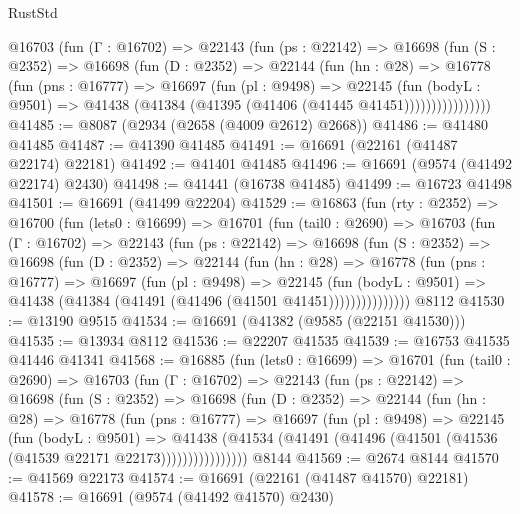 \begin{lexlean}{RustStd}
\begin{coremodule}
          @16703
            (fun (Γ : @16702) =>
            @22143
              (fun (ps : @22142) =>
              @16698
                (fun (S : @2352) =>
                @16698
                  (fun (D : @2352) =>
                  @22144
                    (fun (hn : @28) =>
                    @16778
                      (fun (pns : @16777) =>
                      @16697
                        (fun (pl : @9498) =>
                        @22145
                          (fun (bodyL : @9501) =>
                          @41438 (@41384 (@41395 (@41406 (@41445 @41451))))))))))))))))
@41485 := @8087 (@2934 (@2658 (@4009 @2612) @2668))
@41486 := @41480 @41485
@41487 := @41390 @41485
@41491 := @16691 (@22161 (@41487 @22174) @22181)
@41492 := @41401 @41485
@41496 := @16691 (@9574 (@41492 @22174) @2430)
@41498 := @41441 (@16738 @41485)
@41499 := @16723 @41498
@41501 := @16691 (@41499 @22204)
@41529 := @16863
    (fun (rty : @2352) =>
    @16700
      (fun (lets0 : @16699) =>
      @16701
        (fun (tail0 : @2690) =>
        @16703
          (fun (Γ : @16702) =>
          @22143
            (fun (ps : @22142) =>
            @16698
              (fun (S : @2352) =>
              @16698
                (fun (D : @2352) =>
                @22144
                  (fun (hn : @28) =>
                  @16778
                    (fun (pns : @16777) =>
                    @16697
                      (fun (pl : @9498) =>
                      @22145
                        (fun (bodyL : @9501) =>
                        @41438 (@41384 (@41491 (@41496 (@41501 @41451)))))))))))))))
    @8112
@41530 := @13190 @9515
@41534 := @16691 (@41382 (@9585 (@22151 @41530)))
@41535 := @13934 @8112
@41536 := @22207 @41535
@41539 := @16753 @41535 @41446 @41341
@41568 := @16885
    (fun (lets0 : @16699) =>
    @16701
      (fun (tail0 : @2690) =>
      @16703
        (fun (Γ : @16702) =>
        @22143
          (fun (ps : @22142) =>
          @16698
            (fun (S : @2352) =>
            @16698
              (fun (D : @2352) =>
              @22144
                (fun (hn : @28) =>
                @16778
                  (fun (pns : @16777) =>
                  @16697
                    (fun (pl : @9498) =>
                    @22145
                      (fun (bodyL : @9501) =>
                      @41438
                        (@41534
                          (@41491 (@41496 (@41501 (@41536 (@41539 @22171 @22173))))))))))))))))
    @8144
@41569 := @2674 @8144
@41570 := @41569 @22173
@41574 := @16691 (@22161 (@41487 @41570) @22181)
@41578 := @16691 (@9574 (@41492 @41570) @2430)

\end{coremodule}
\end{lexlean}
